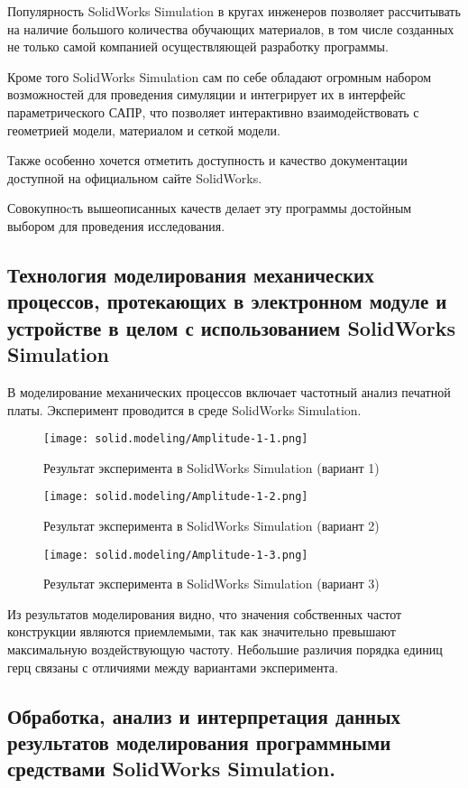 Популярность SolidWorks Simulation в кругах инженеров позволяет
рассчитывать на наличие большого количества обучающих материалов, в
том числе созданных не только самой компанией осуществляющей
разработку программы.

Кроме того SolidWorks Simulation сам по себе обладают огромным набором
возможностей для проведения симуляции и интегрирует их в интерфейс
параметрического САПР, что позволяет интерактивно взаимодействовать с
геометрией модели, материалом и сеткой модели.

Также особенно хочется отметить доступность и качество документации
доступной на официальном сайте SolidWorks.

Совокупноcть вышеописанных качеств делает эту программы достойным
выбором для проведения исследования.

\subsection{Технология моделирования механических процессов,
протекающих в электронном модуле и устройстве в целом с
использованием  SolidWorks Simulation}

В моделирование механических процессов включает частотный анализ
печатной платы. Эксперимент проводится в среде SolidWorks Simulation.

\begin{figure}[H]
  \centering
  \texttt{[image: solid.modeling/Amplitude-1-1.png]}
  \caption{Результат эксперимента в SolidWorks Simulation (вариант 1)}
\end{figure}

\begin{figure}[H]
  \centering
  \texttt{[image: solid.modeling/Amplitude-1-2.png]}
  \caption{Результат эксперимента в SolidWorks Simulation (вариант 2)}
\end{figure}

\begin{figure}[H]
  \centering
  \texttt{[image: solid.modeling/Amplitude-1-3.png]}
  \caption{Результат эксперимента в SolidWorks Simulation (вариант 3)}
\end{figure}

Из результатов моделирования видно, что значения собственных частот
конструкции являются приемлемыми, так как значительно превышают
максимальную воздействующую частоту. Небольшие различия порядка
единиц герц связаны с отличиями между вариантами эксперимента.

\subsection{Обработка, анализ и интерпретация данных результатов
моделирования программными средствами SolidWorks Simulation.}

